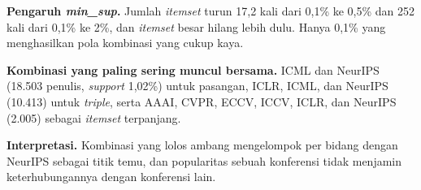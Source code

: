 \textbf{Pengaruh \textit{min\_sup}.} Jumlah \textit{itemset} turun 17,2 kali dari 0,1\% ke 0,5\% dan 252 kali dari 0,1\% ke 2\%, dan \textit{itemset} besar hilang lebih dulu. Hanya 0,1\% yang menghasilkan pola kombinasi yang cukup kaya.

\textbf{Kombinasi yang paling sering muncul bersama.} ICML dan NeurIPS (18.503 penulis, \textit{support} 1,02\%) untuk pasangan, ICLR, ICML, dan NeurIPS (10.413) untuk \textit{triple}, serta AAAI, CVPR, ECCV, ICCV, ICLR, dan NeurIPS (2.005) sebagai \textit{itemset} terpanjang.

\textbf{Interpretasi.} Kombinasi yang lolos ambang mengelompok per bidang dengan NeurIPS sebagai titik temu, dan popularitas sebuah konferensi tidak menjamin keterhubungannya dengan konferensi lain.
